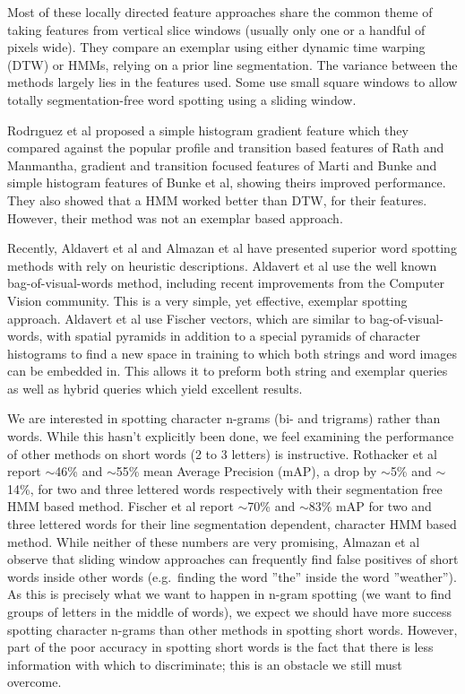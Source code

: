 \documentclass[ms]{byuprop}
\begin{document}
Most of these locally directed feature approaches share the common theme of taking features from vertical slice windows (usually only one or a handful of pixels wide). They compare an exemplar using either dynamic time warping (DTW) or HMMs, relying on a prior line segmentation. The variance between the methods largely lies in the features used. Some use small square windows to allow totally segmentation-free word spotting using a sliding window\cite{Rothacker2013}.

Rodr{\i}guez et al\cite{Rodrıguez2008} proposed a simple histogram gradient feature which they compared against the popular profile and transition based features of Rath and Manmantha\cite{Rath2003}, gradient and transition focused features of Marti and Bunke\cite{Marti2001} and simple histogram features of Bunke et al\cite{Bunke2004}, showing theirs improved performance. They also showed that a HMM worked better than DTW, for their features. However, their method was not an exemplar based approach.

Recently, Aldavert et al\cite{Aldavert2015} and Almazan et al\cite{Almazan2014} have presented superior word spotting methods with rely on heuristic descriptions. Aldavert et al use the well known bag-of-visual-words method, including recent improvements from the Computer Vision community. This is a very simple, yet effective, exemplar spotting approach. Aldavert et al use Fischer vectors, which are similar to bag-of-visual-words, with spatial pyramids in addition to a special pyramids of character histograms to find a new space in training to which both strings and word images can be embedded in. This allows it to preform both string and exemplar queries as well as hybrid queries which yield excellent results.

We are interested in spotting character n-grams (bi- and trigrams) rather than words. While this hasn't explicitly been done, we feel examining the performance of other methods on short words (2 to 3 letters) is instructive. Rothacker et al\cite{Rothacker2013} report $\sim$46\% and $\sim$55\% mean Average Precision (mAP), a drop by $\sim$5\% and $\sim$14\%, for two and three lettered words respectively with their segmentation free HMM based method. Fischer et al\cite{Fischer2012} report $\sim$70\% and $\sim$83\% mAP for two and three lettered words for their line segmentation dependent, character HMM based method. While neither of these numbers are very promising, Almazan et al\cite{Almazan2012} observe that sliding window approaches can frequently find false positives of short words inside other words (e.g.~finding the word ''the'' inside the word ''weather''). As this is precisely what we want to happen in n-gram spotting (we want to find groups of letters in the middle of words), we expect we should have more success spotting character n-grams than other methods in spotting short words. However, part of the poor accuracy in spotting short words is the fact that there is less information with which to discriminate; this is an obstacle we still must overcome.
\end{document}
